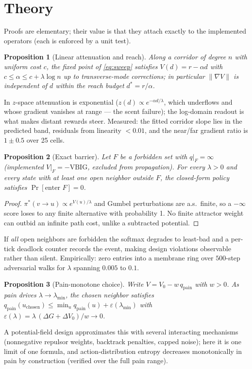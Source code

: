 \documentclass[11pt]{article}
\newtheorem{proposition}{Proposition}
\begin{document}
\section{Theory}
\label{sec:theory}
Proofs are elementary; their value is that they attach exactly to the implemented operators (each is enforced by a unit test).

\begin{proposition}[Linear attenuation and reach]
\label{prop:linear}
Along a corridor of degree $n$ with uniform cost $c$, the fixed point of \cref{eq:sweep} satisfies $V(d) = r - \alpha d$ with $c \le \alpha \le c + \lambda\log n$ up to transverse-mode corrections; in particular $\|\nabla V\|$ is independent of $d$ within the reach budget $d^\ast = r/\alpha$.
\end{proposition}
\noindent In $z$-space attenuation is exponential ($z(d) \propto e^{-\alpha d/\lambda}$, which underflows and whose gradient vanishes at range --- the scent failure); the log-domain readout is what makes distant rewards steer. Measured: the fitted corridor slope lies in the predicted band, residuals from linearity $<0.01$, and the near/far gradient ratio is $1{\pm}0.5$ over 25 cells.

\begin{proposition}[Exact barrier]
\label{prop:barrier}
Let $F$ be a forbidden set with $q|_F=\infty$ (implemented $V|_F = -\text{VBIG}$, excluded from propagation). For every $\lambda>0$ and every state with at least one open neighbor outside $F$, the closed-form policy satisfies $\Pr[\text{enter } F]=0$.
\end{proposition}
\begin{proof}
$\pi^\ast(v\to u)\propto e^{V(u)/\lambda}$ and Gumbel perturbations are a.s.\ finite, so a $-\infty$ score loses to any finite alternative with probability 1. No finite attractor weight can outbid an infinite path cost, unlike a subtracted potential.
\end{proof}
\noindent If \emph{all} open neighbors are forbidden the softmax degrades to least-bad and a per-tick deadlock counter records the event, making design violations observable rather than silent. Empirically: zero entries into a membrane ring over $500$-step adversarial walks for $\lambda$ spanning $0.005$ to $0.1$.

\begin{proposition}[Pain-monotone choice]
\label{prop:pain}
Write $V = V_0 - w\,q_{\text{pain}}$ with $w>0$. As pain drives $\lambda\to\lambda_{\min}$, the chosen neighbor satisfies $q_{\text{pain}}(u_{\text{chosen}}) \le \min_{u} q_{\text{pain}}(u) + \varepsilon(\lambda_{\min})$ with $\varepsilon(\lambda) = \lambda\,(\Delta G + \Delta V_0)/w \to 0$.
\end{proposition}
\noindent A potential-field design approximates this with several interacting mechanisms (nonnegative repulsor weights, backtrack penalties, capped noise); here it is one limit of one formula, and action-distribution entropy decreases monotonically in pain by construction (verified over the full pain range).
\end{document}
